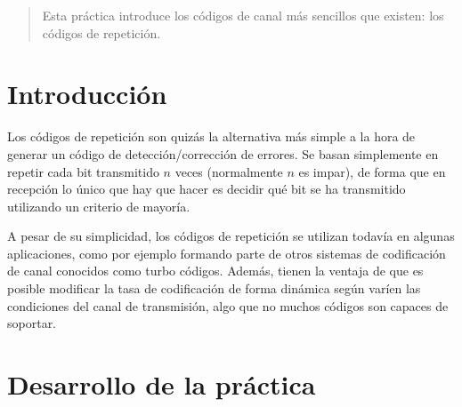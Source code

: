 \documentclass[es,practica,12pt]{uah}
\begin{document}

\maketitle

\begin{abstract}
	Esta práctica introduce los códigos de canal más sencillos que existen: los códigos de repetición. 
\end{abstract}

\section{Introducción}

Los códigos de repetición son quizás la alternativa más simple a la hora de generar un código de detección/corrección de errores. Se basan simplemente en repetir cada bit transmitido $n$ veces (normalmente $n$ es impar), de forma que en recepción lo único que hay que hacer es decidir qué bit se ha transmitido utilizando un criterio de mayoría. 

A pesar de su simplicidad, los códigos de repetición se utilizan todavía en algunas aplicaciones, como por ejemplo formando parte de otros sistemas de codificación de canal conocidos como turbo códigos. Además, tienen la ventaja de que es posible modificar la tasa de codificación de forma dinámica según varíen las condiciones del canal de transmisión, algo que no muchos códigos son capaces de soportar. 

\section{Desarrollo de la práctica}
\end{document}
